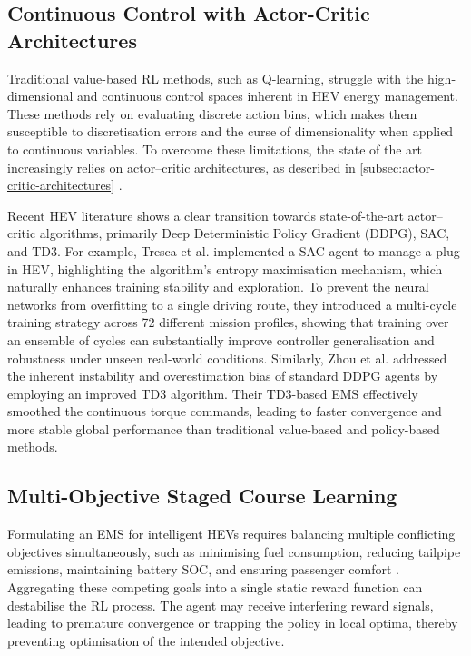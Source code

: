 \subsection{Continuous Control with Actor-Critic Architectures}
Traditional value-based \ac{RL} methods, such as Q-learning, struggle with the high-dimensional and continuous control spaces inherent in \ac{HEV} energy management. These methods rely on evaluating discrete action bins, which makes them susceptible to discretisation errors and the curse of dimensionality when applied to continuous variables. To overcome these limitations, the state of the art increasingly relies on actor--critic architectures, as described in \autoref{subsec:actor-critic-architectures} \cite{tang_double_2022, zhou_novel_2021}.

Recent \ac{HEV} literature shows a clear transition towards state-of-the-art actor--critic algorithms, primarily Deep Deterministic Policy Gradient (DDPG), \ac{SAC}, and \ac{TD3}. For example, Tresca et al. \cite{tresca_cutting-edge_2025} implemented a \ac{SAC} agent to manage a plug-in \ac{HEV}, highlighting the algorithm's entropy maximisation mechanism, which naturally enhances training stability and exploration. To prevent the neural networks from overfitting to a single driving route, they introduced a multi-cycle training strategy across 72 different mission profiles, showing that training over an ensemble of cycles can substantially improve controller generalisation and robustness under unseen real-world conditions. Similarly, Zhou et al. \cite{zhou_novel_2021} addressed the inherent instability and overestimation bias of standard DDPG agents by employing an improved \ac{TD3} algorithm. Their \ac{TD3}-based \ac{EMS} effectively smoothed the continuous torque commands, leading to faster convergence and more stable global performance than traditional value-based and policy-based methods.

\subsection{Multi-Objective Staged Course Learning}
Formulating an \ac{EMS} for intelligent \acp{HEV} requires balancing multiple conflicting objectives simultaneously, such as minimising fuel consumption, reducing tailpipe emissions, maintaining battery \ac{SOC}, and ensuring passenger comfort \cite{wang_energy_2025}. Aggregating these competing goals into a single static reward function can destabilise the \ac{RL} process. The agent may receive interfering reward signals, leading to premature convergence or trapping the policy in local optima, thereby preventing optimisation of the intended objective.

